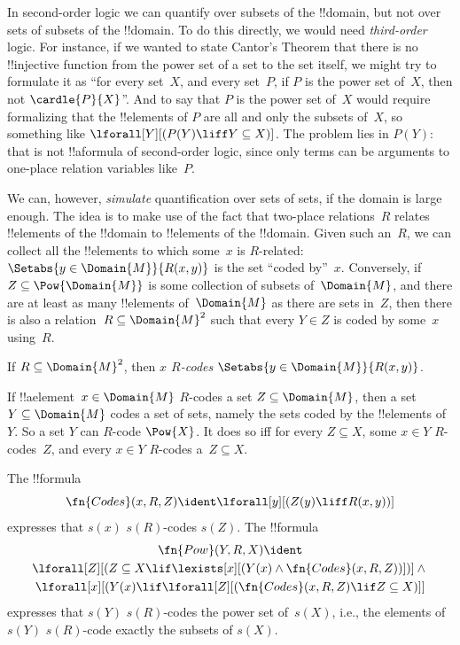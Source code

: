 \documentclass[../../../include/open-logic-section]{subfiles}
\begin{document}


\begin{explain}
In second-order logic we can quantify over subsets of the !!{domain},
but not over sets of subsets of the !!{domain}. To do this directly,
we would need \emph{third-order} logic.  For instance, if we wanted to
state Cantor's Theorem that there is no !!{injective} function from
the power set of a set to the set itself, we might try to formulate it
as ``for every set~$X$, and every set~$P$, if $P$ is the power set
of~$X$, then not $\cardle{P}{X}$''. And to say that $P$ is the power set
of~$X$ would require formalizing that the !!{element}s of $P$ are all
and only the subsets of~$X$, so something like $\lforall[Y][(P(Y)
  \liff Y \subseteq X)]$. The problem lies in $P(Y)$: that is not
!!a{formula} of second-order logic, since only terms can be arguments
to one-place relation variables like~$P$.

We can, however, \emph{simulate} quantification over sets of sets, if
the domain is large enough.  The idea is to make use of the fact that
two-place relations~$R$ relates !!{element}s of the !!{domain} to
!!{element}s of the !!{domain}. Given such an~$R$, we can collect all
the !!{element}s to which some~$x$ is $R$-related: $\Setabs{y \in
  \Domain{M}}{R(x,y)}$ is the set ``coded by''~$x$.  Conversely, if
$Z \subseteq \Pow{\Domain{M}}$ is some collection of subsets
of~$\Domain{M}$, and there are at least as many !!{element}s
of~$\Domain{M}$ as there are sets in~$Z$, then there is also a
relation~$R \subseteq \Domain{M}^2$ such that every $Y \in Z$ is coded
by some~$x$ using~$R$.
\end{explain}

\begin{defn}
If $R \subseteq \Domain{M}^2$, then \emph{$x$ $R$-codes} $\Setabs{y
  \in \Domain{M}}{R(x, y)}$.
\end{defn}

If !!a{element}~$x \in \Domain{M}$ $R$-codes a set $Z \subseteq
\Domain{M}$, then a set $Y \subseteq \Domain{M}$ codes a set of sets,
namely the sets coded by the !!{element}s of~$Y$.  So a set $Y$ can
$R$-code $\Pow{X}$. It does so iff for every $Z \subseteq X$, some $x
\in Y$ $R$-codes~$Z$, and every $x \in Y$ $R$-codes a~$Z \subseteq X$.

\begin{prop}
The !!{formula}
  \[
  \fn{Codes}(x, R, Z) \ident \lforall[y][(Z(y) \liff
    R(x, y))]
  \]
expresses that $s(x)$ $s(R)$-codes $s(Z)$.  The
!!{formula} 
\begin{multline*}
  \fn{Pow}(Y, R, X) \ident \\
  \lforall[Z][(Z \subseteq X \lif \lexists[x][(Y(x) \land
    \fn{Codes}(x, R, Z))])] \land {} \\ \lforall[x][(Y(x) \lif
  \lforall[Z][(\fn{Codes}(x, R, Z) \lif Z \subseteq X)]]
\end{multline*}
expresses that $s(Y)$ $s(R)$-codes the power set of~$s(X)$, i.e., the
elements of $s(Y)$ $s(R)$-code exactly the subsets of $s(X)$.
\end{prop}
\end{document}

